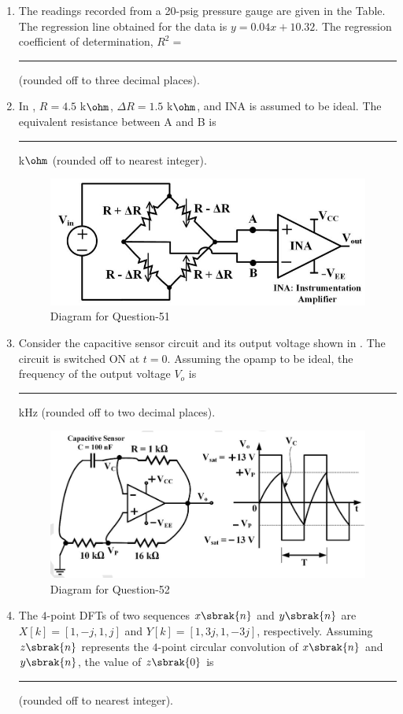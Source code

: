 \documentclass[journal,12pt,onecolumn]{IEEEtran}
\theoremstyle{remark}
\begin{document}
\begin{enumerate}
\item The readings recorded from a 20-psig pressure gauge are given in the Table. The regression line obtained for the data is $y = 0.04 x + 10.32$. The regression coefficient of determination, $R^2 =$ \rule{1.5cm}{0.4pt} (rounded off to three decimal places).

\begin{table}[H]
\centering

\end{table}

\item In , $R = 4.5$ k$\ohm$, $\Delta R = 1.5$ k$\ohm$, and INA is assumed to be ideal. The equivalent resistance between A and B is \rule{1.5cm}{0.4pt} k$\ohm$ (rounded off to nearest integer).
\par\hfill{}
\begin{figure}[H]
    \centering
    \includegraphics[width=0.4\columnwidth]{Figs/Q-51.png}
    \caption{Diagram for Question-51}
    \label{51}
\end{figure}

\item Consider the capacitive sensor circuit and its output voltage shown in . The circuit is switched ON at $t=0$. Assuming the opamp to be ideal, the frequency of the output voltage $V_o$ is \rule{1.5cm}{0.4pt} kHz (rounded off to two decimal places).
\par\hfill{}
\begin{figure}[H]
    \centering
    \includegraphics[width=0.7\columnwidth]{Figs/Q-52.png}
    \caption{Diagram for Question-52}
    \label{52}
\end{figure}

\item The $4$-point DFTs of two sequences $x\sbrak{n}$ and $y\sbrak{n}$ are $X[k] = [1, -j, 1, j]$ and $Y[k] = [1, 3j, 1, -3j]$, respectively. Assuming $z\sbrak{n}$ represents the $4$-point circular convolution of $x\sbrak{n}$ and $y\sbrak{n}$, the value of $z\sbrak{0}$ is \rule{1.5cm}{0.4pt} (rounded off to nearest integer).


\end{enumerate}
\end{document}
